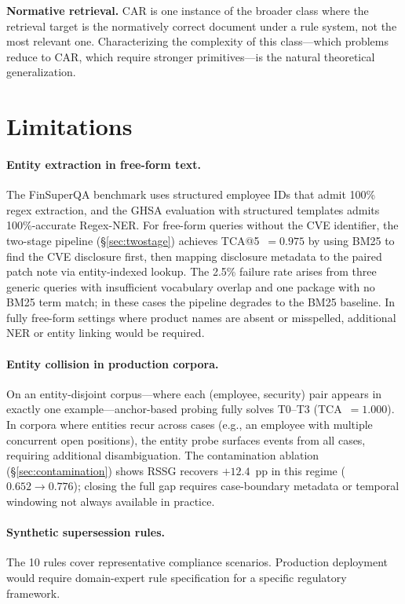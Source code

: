 \documentclass[11pt]{article}
\begin{document}
\textbf{Normative retrieval.} CAR is one instance of the broader class where the retrieval target is the normatively correct document under a rule system, not the most relevant one. Characterizing the complexity of this class---which problems reduce to CAR, which require stronger primitives---is the natural theoretical generalization.

\section{Limitations}
\label{sec:limitations}

\paragraph{Entity extraction in free-form text.} The FinSuperQA benchmark uses structured employee IDs that admit 100\% regex extraction, and the GHSA evaluation with structured templates admits 100\%-accurate Regex-NER. For free-form queries without the CVE identifier, the two-stage pipeline (\S\ref{sec:twostage}) achieves TCA@5~$= 0.975$ by using BM25 to find the CVE disclosure first, then mapping disclosure metadata to the paired patch note via entity-indexed lookup. The 2.5\% failure rate arises from three generic queries with insufficient vocabulary overlap and one package with no BM25 term match; in these cases the pipeline degrades to the BM25 baseline. In fully free-form settings where product names are absent or misspelled, additional NER or entity linking would be required.

\paragraph{Entity collision in production corpora.} On an entity-disjoint corpus---where each (employee, security) pair appears in exactly one example---anchor-based probing fully solves T0--T3 (TCA~$= 1.000$). In corpora where entities recur across cases (e.g., an employee with multiple concurrent open positions), the entity probe surfaces events from all cases, requiring additional disambiguation. The contamination ablation (\S\ref{sec:contamination}) shows RSSG recovers $+12.4$~pp in this regime ($0.652 \to 0.776$); closing the full gap requires case-boundary metadata or temporal windowing not always available in practice.

\paragraph{Synthetic supersession rules.} The 10 rules cover representative compliance scenarios. Production deployment would require domain-expert rule specification for a specific regulatory framework.
\end{document}
